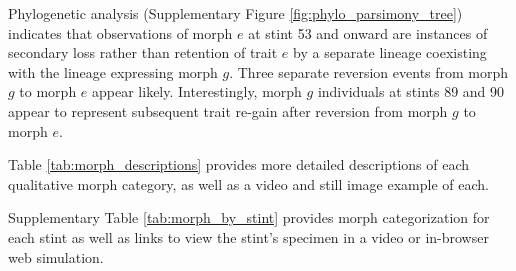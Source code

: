 Phylogenetic analysis (Supplementary Figure \ref{fig:phylo_parsimony_tree}) indicates that observations of morph $e$ at stint 53 and onward are instances of secondary loss rather than retention of trait $e$ by a separate lineage coexisting with the lineage expressing morph $g$.
Three separate reversion events from morph $g$ to morph $e$ appear likely.
Interestingly, morph $g$ individuals at stints 89 and 90 appear to represent subsequent trait re-gain after reversion from morph $g$ to morph $e$.

Table \ref{tab:morph_descriptions} provides more detailed descriptions of each qualitative morph category, as well as a video and still image example of each.

Supplementary Table \ref{tab:morph_by_stint} provides morph categorization for each stint as well as links to view the stint's specimen in a video or in-browser web simulation.







